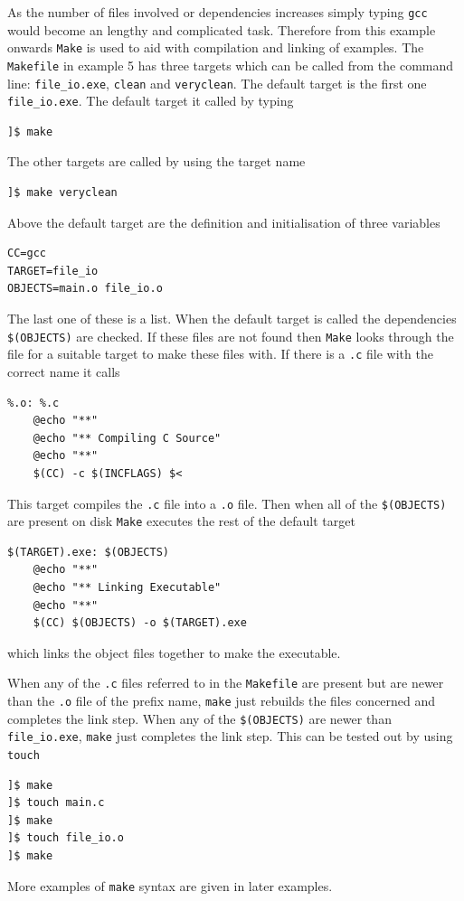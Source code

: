 \documentclass[11pt]{scrartcl}
\begin{document}
As the number of files involved or dependencies increases simply
typing \texttt{gcc} would become an lengthy and complicated
task. Therefore from this example onwards \texttt{Make}\cite{make} is
used to aid with compilation and linking of examples.  The
\texttt{Makefile} in example 5 has three targets which can be called
from the command line:
\texttt{file\_io.exe}, \texttt{clean} and \texttt{veryclean}.  The
default target is the first one \texttt{file\_io.exe}.  The default
target it called by typing
\lstset{language=make}
\begin{verbatim}
]$ make
\end{verbatim} %
The other targets are called by using the target name
\begin{verbatim}
]$ make veryclean
\end{verbatim} %
Above the default target are the definition and initialisation of
three variables
\begin{lstlisting}
CC=gcc
TARGET=file_io
OBJECTS=main.o file_io.o
\end{lstlisting}
The last one of these is a list.  When the default target is called
the dependencies \texttt{\$(OBJECTS)} are checked.  If these files are
not found then \texttt{Make} looks through the file for a suitable
target to make these files with.  If there is a \texttt{.c} file with
the correct name it calls
\begin{lstlisting}
%.o: %.c
	@echo "**"
	@echo "** Compiling C Source" 
	@echo "**"
	$(CC) -c $(INCFLAGS) $<
\end{lstlisting} %
This target compiles the \texttt{.c} file into a \texttt{.o} file.
Then when all of the \texttt{\$(OBJECTS)} are present on disk
\texttt{Make} executes the rest of the default target
\begin{lstlisting}
$(TARGET).exe: $(OBJECTS)
	@echo "**"
	@echo "** Linking Executable"
	@echo "**"
	$(CC) $(OBJECTS) -o $(TARGET).exe
\end{lstlisting} %
which links the object files together to make the executable.

When any of the \texttt{.c} files referred to in the \texttt{Makefile}
are present but are newer than the \texttt{.o} file of the prefix
name, \texttt{make} just rebuilds the files concerned and
completes the link step.  When any of the \texttt{\$(OBJECTS)} are
newer than \texttt{file\_io.exe}, \texttt{make} just completes the
link step.  This can be tested out by using \texttt{touch}
\begin{verbatim}
]$ make
]$ touch main.c
]$ make
]$ touch file_io.o
]$ make
\end{verbatim} %
More examples of \texttt{make} syntax are given in later examples.
\end{document}

